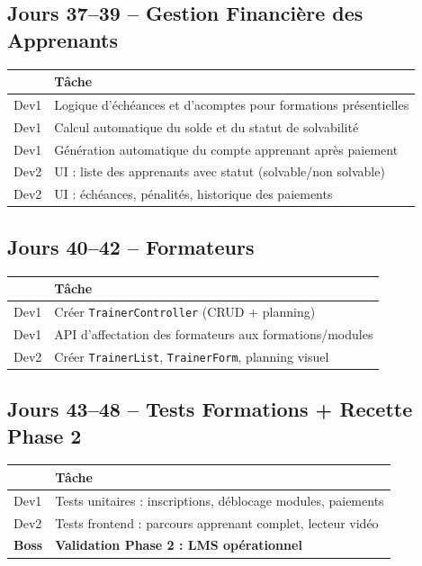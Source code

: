 \documentclass[12pt,a4paper]{report}
\begin{document}
\subsection*{Jours 37--39 -- Gestion Financière des Apprenants}

\begin{tabularx}{\textwidth}{l X}
    \toprule
    & \textbf{Tâche} \\
    \midrule
    Dev1 & Logique d'échéances et d'acomptes pour formations présentielles \\
    Dev1 & Calcul automatique du solde et du statut de solvabilité \\
    Dev1 & Génération automatique du compte apprenant après paiement \\
    Dev2 & UI : liste des apprenants avec statut (solvable/non solvable) \\
    Dev2 & UI : échéances, pénalités, historique des paiements \\
    \bottomrule
\end{tabularx}

\subsection*{Jours 40--42 -- Formateurs}

\begin{tabularx}{\textwidth}{l X}
    \toprule
    & \textbf{Tâche} \\
    \midrule
    Dev1 & Créer \texttt{TrainerController} (CRUD + planning) \\
    Dev1 & API d'affectation des formateurs aux formations/modules \\
    Dev2 & Créer \texttt{TrainerList}, \texttt{TrainerForm}, planning visuel \\
    \bottomrule
\end{tabularx}

\subsection*{Jours 43--48 -- Tests Formations + Recette Phase 2}

\begin{tabularx}{\textwidth}{l X}
    \toprule
    & \textbf{Tâche} \\
    \midrule
    Dev1 & Tests unitaires : inscriptions, déblocage modules, paiements \\
    Dev2 & Tests frontend : parcours apprenant complet, lecteur vidéo \\
    \textbf{Boss} & \textbf{Validation Phase 2 : LMS opérationnel} \\
    \bottomrule
\end{tabularx}
\end{document}

